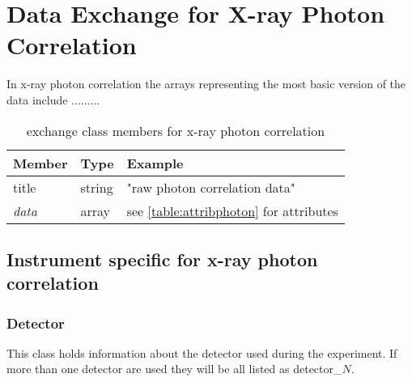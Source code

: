 \section{Data Exchange for X-ray Photon Correlation}
\label{exchange:photon}

In x-ray photon correlation the arrays representing the most basic version of the data include .........

\begin{table}[h!]\sffamily \footnotesize
\caption{exchange class members for x-ray photon correlation}

\begin{tabular}{p{2.0cm} p{3.0cm}  p{6.5cm} }
\toprule
\bfseries Member     & \bfseries Type & \bfseries Example \\
\midrule
title  & string & "raw photon correlation data" \\
\emph{data}  &  array & see \ref{table:attribphoton} for attributes \\
\bottomrule
\end{tabular}
\end{table}



\subsection{Instrument specific for x-ray photon correlation}
\label{instrument:photon}

\subsubsection{Detector}
\label{table:detectorphoton}

This class holds information about the detector used during the experiment. If  more than one detector are used they will be all listed as detector\_$N$.


